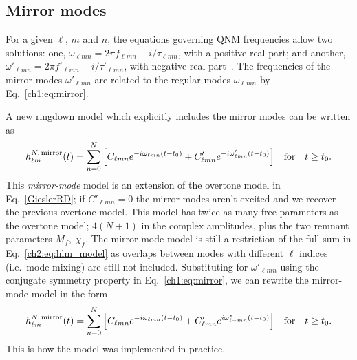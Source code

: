 \subsection{Mirror modes} \label{subsec:mirror_modes}

For a given $\ell$, $m$ and $n$, the equations governing QNM frequencies allow two solutions: one, $\omega_{\ell m n} = 2\pi f_{\ell m n} - i/\tau_{\ell m n}$, with a positive real part; and another, $\omega'_{\ell m n} = 2\pi f'_{\ell m n} - i/ \tau'_{\ell m n}$, with negative real part~\cite{Dhani:2020nik, Berti:2005ys}.
The frequencies of the mirror modes $\omega'_{\ell m n}$ are related to the regular modes $\omega_{\ell m n}$ by Eq.~\ref{ch1:eq:mirror}.

A new ringdown model which explicitly includes the mirror modes can be written as
\begin{equation}
    h_{\ell m}^{N,\, {\rm mirror}}(t) = \sum_{n=0}^N \qty[ C_{\ell m n} e^{-i \omega_{\ell m n}(t-t_0)} + C'_{\ell m n} e^{-i \omega'_{\ell m n}(t-t_0)} ]\quad \textrm{for} \quad t \geq t_0.
\end{equation}
This \emph{mirror-mode} model is an extension of the overtone model in Eq.~\ref{GieslerRD}; if $C'_{\ell m n} = 0$ the mirror modes aren't excited and we recover the previous overtone model. 
This model has twice as many free parameters as the overtone model; $4(N+1)$ in the complex amplitudes, plus the two remnant parameters $M_f,\; \chi_f$.
The mirror-mode model is still a restriction of the full sum in Eq.~\ref{ch2:eq:hlm_model} as overlaps between modes with different $\ell$ indices (i.e.\ mode mixing) are still not included.
Substituting for $\omega'_{\ell m n}$ using the conjugate symmetry property in Eq.~\ref{ch1:eq:mirror}, we can rewrite the mirror-mode model in the form
\begin{equation} \label{ch2:eq:mirror_model}
   h_{\ell m}^{N,\, {\rm mirror}}(t) = \sum_{n=0}^N \qty[ C_{\ell m n} e^{-i \omega_{\ell m n}(t-t_0)} + C'_{\ell m n} e^{i \omega^*_{\ell -m n}(t-t_0)} ]\quad \textrm{for} \quad t \geq t_0.
\end{equation}
This is how the model was implemented in practice.

